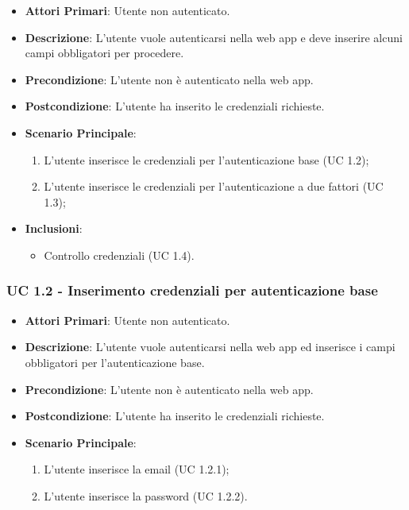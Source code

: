 		\begin{itemize}
			\item \textbf{Attori Primari}: Utente non autenticato.
			\item \textbf{Descrizione}: L'utente vuole autenticarsi nella web app e deve inserire alcuni campi obbligatori per procedere.
			\item \textbf{Precondizione}: L'utente non è autenticato nella web app.
			\item \textbf{Postcondizione}: L'utente ha inserito le credenziali richieste.
			\item \textbf{Scenario Principale}:
			\begin{enumerate}
				\item L'utente inserisce le credenziali per l'autenticazione base (UC 1.2);
				\item L'utente inserisce le credenziali per l'autenticazione a due fattori (UC 1.3);
			\end{enumerate}
			\item \textbf{Inclusioni}:
				\begin{itemize}
					\item Controllo credenziali (UC 1.4).
				\end{itemize}
		\end{itemize}

		\subsubsection{UC 1.2 - Inserimento credenziali per autenticazione base}
		\begin{itemize}
			\item \textbf{Attori Primari}: Utente non autenticato.
			\item \textbf{Descrizione}: L'utente vuole autenticarsi nella web app ed inserisce i campi obbligatori per l'autenticazione base.
			\item \textbf{Precondizione}: L'utente non è autenticato nella web app.
			\item \textbf{Postcondizione}: L'utente ha inserito le credenziali richieste.
			\item \textbf{Scenario Principale}:
			\begin{enumerate}
				\item L'utente inserisce la email (UC 1.2.1);
				\item L'utente inserisce la password (UC 1.2.2).
			\end{enumerate}	
		\end{itemize}


